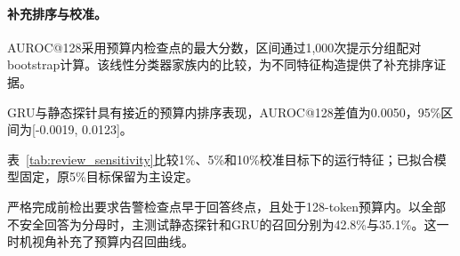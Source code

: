 \paragraph{补充排序与校准。}

\ReviewRankingZH{} AUROC@128采用预算内检查点的最大分数，区间通过1,000次提示分组配对bootstrap计算。该线性分类器家族内的比较，为不同特征构造提供了补充排序证据。

GRU与静态探针具有接近的预算内排序表现，AUROC@128差值为0.0050，95\%区间为[-0.0019, 0.0123]。

表~\ref{tab:review_sensitivity}比较1\%、5\%和10\%校准目标下的运行特征；已拟合模型固定，原5\%目标保留为主设定。

严格完成前检出要求告警检查点早于回答终点，且处于128-token预算内。以全部不安全回答为分母时，主测试静态探针和GRU的召回分别为42.8\%与35.1\%。这一时机视角补充了预算内召回曲线。
